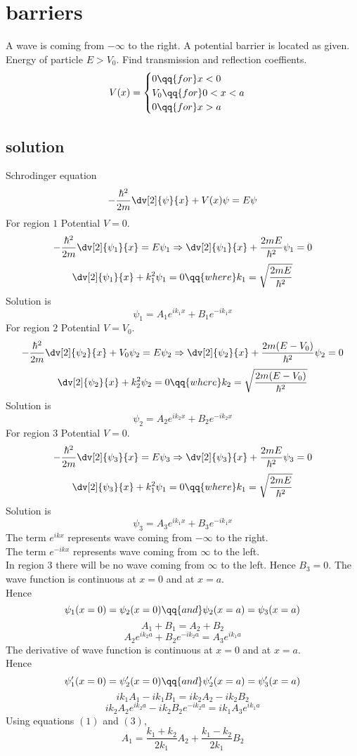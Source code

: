 \section*{barriers}
A wave is coming from $-\infty$ to the right. A potential barrier is located as given. 
Energy of particle $E>V_0$. Find transmission and reflection coeffients.
$$
V(x)=
\begin{cases}
    0 \qq{for} x < 0 \\
    V_0 \qq{for} 0 < x < a \\
    0 \qq{for} x > a
\end{cases}
$$
\subsection*{solution}
Schrodinger equation 
\[-\frac{\hbar^2}{2m}\dv[2]{\psi}{x}+V(x)\psi=E\psi\]
For region $1$ Potential $V=0$. 
\[-\frac{\hbar^2}{2m}\dv[2]{\psi_1}{x}=E\psi_1\Rightarrow \dv[2]{\psi_1}{x}+\frac{2mE}{\hbar^2}\psi_1=0\]
\[\dv[2]{\psi_1}{x}+k_1^2\psi_1=0\qq{where} k_1=\sqrt{\frac{2mE}{\hbar^2}}\]
Solution is 
\[\psi_1=A_1e^{ik_1x}+B_1e^{-ik_1x}\]
For region $2$ Potential $V=V_0$. 
\[-\frac{\hbar^2}{2m}\dv[2]{\psi_2}{x}+V_0\psi_2=E\psi_2\Rightarrow \dv[2]{\psi_2}{x}+\frac{2m(E-V_0)}{\hbar^2}\psi_2=0\]
\[\dv[2]{\psi_2}{x}+k_2^2\psi_2=0\qq{where} k_2=\sqrt{\frac{2m(E-V_0)}{\hbar^2}}\]
Solution is 
\[\psi_2=A_2e^{ik_2x}+B_2e^{-ik_2x}\]
For region $3$ Potential $V=0$. 
\[-\frac{\hbar^2}{2m}\dv[2]{\psi_3}{x}=E\psi_3\Rightarrow \dv[2]{\psi_3}{x}+\frac{2mE}{\hbar^2}\psi_3=0\]
\[\dv[2]{\psi_3}{x}+k_1^2\psi_1=0\qq{where} k_1=\sqrt{\frac{2mE}{\hbar^2}}\]
Solution is 
\[\psi_3=A_3e^{ik_1x}+B_3e^{-ik_1x}\]
\newpage
The term $e^{ikx}$ represents wave coming from $-\infty$ to the right.\\
The term $e^{-ikx}$ represents wave coming from $\infty$ to the left.\\
In region $3$ there will be no wave coming from $\infty$ to the left. Hence $B_3=0$.
The wave function is continuous at $x=0$ and at $x=a$.\\
Hence 
\[\psi_1(x=0)=\psi_2(x=0) \qq{and} \psi_2(x=a)=\psi_3(x=a)\]
\[A_1+B_1=A_2+B_2\tag{1}\]
\[A_2e^{ik_2a}+B_2e^{-ik_2a}=A_3e^{ik_1a}\tag{2}\]
The derivative of wave function is continuous at $x=0$ and at $x=a$.\\
Hence 
\[\psi'_1(x=0)=\psi'_2(x=0) \qq{and} \psi'_2(x=a)=\psi'_3(x=a)\]
\[ik_1A_1-ik_1B_1=ik_2A_2-ik_2B_2\tag{3}\]
\[ik_2A_2e^{ik_2a}-ik_2B_2e^{-ik_2a}=ik_1A_3e^{ik_1a}\tag{4}\]
Using equations $(1)$ and $(3)$,
\[A_1=\frac{k_1+k_2}{2k_1}A_2+\frac{k_1-k_2}{2k_1}B_2\]
